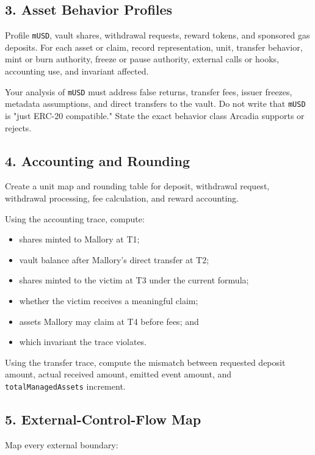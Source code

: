 \subsection*{3. Asset Behavior Profiles}

Profile \texttt{mUSD}, vault shares, withdrawal requests, reward tokens, and sponsored gas deposits. For each asset or claim, record representation, unit, transfer behavior, mint or burn authority, freeze or pause authority, external calls or hooks, accounting use, and invariant affected.

Your analysis of \texttt{mUSD} must address false returns, transfer fees, issuer freezes, metadata assumptions, and direct transfers to the vault. Do not write that \texttt{mUSD} is "just ERC-20 compatible." State the exact behavior class Arcadia supports or rejects.

\subsection*{4. Accounting and Rounding}

Create a unit map and rounding table for deposit, withdrawal request, withdrawal processing, fee calculation, and reward accounting.

Using the accounting trace, compute:

\begin{itemize}
\item shares minted to Mallory at T1;
\item vault balance after Mallory's direct transfer at T2;
\item shares minted to the victim at T3 under the current formula;
\item whether the victim receives a meaningful claim;
\item assets Mallory may claim at T4 before fees; and
\item which invariant the trace violates.
\end{itemize}

Using the transfer trace, compute the mismatch between requested deposit amount, actual received amount, emitted event amount, and \texttt{totalManagedAssets} increment.

\subsection*{5. External-Control-Flow Map}

Map every external boundary:

